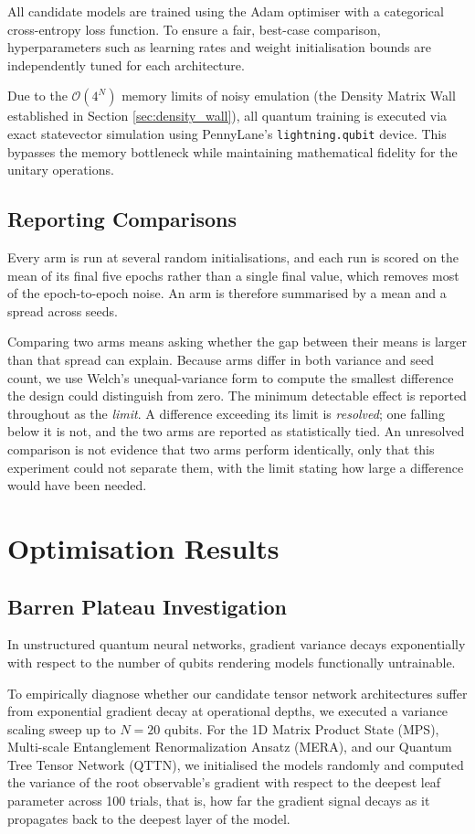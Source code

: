 \documentclass[12pt, a4paper, oneside]{report}
\begin{document}
All candidate models are trained using the Adam optimiser with a categorical cross-entropy loss function. To ensure a fair, best-case comparison, hyperparameters such as learning rates and weight initialisation bounds are independently tuned for each architecture.

Due to the $\mathcal{O}(4^N)$ memory limits of noisy emulation (the Density Matrix Wall established in Section \ref{sec:density_wall}), all quantum training is executed via exact statevector simulation using PennyLane's \texttt{lightning.qubit} device. This bypasses the memory bottleneck while maintaining mathematical fidelity for the unitary operations.

\subsection{Reporting Comparisons}
Every arm is run at several random initialisations, and each run is scored on the mean of its final five epochs rather than a single final value, which removes most of the epoch-to-epoch noise. An arm is therefore summarised by a mean and a spread across seeds.

Comparing two arms means asking whether the gap between their means is larger than that spread can explain. Because arms differ in both variance and seed count, we use Welch's unequal-variance form to compute the smallest difference the design could distinguish from zero. The minimum detectable effect is reported throughout as the \textit{limit}. A difference exceeding its limit is \textit{resolved}; one falling below it is not, and the two arms are reported as statistically tied. An unresolved comparison is not evidence that two arms perform identically, only that this experiment could not separate them, with the limit stating how large a difference would have been needed.

\section{Optimisation Results}

\subsection{Barren Plateau Investigation}
In unstructured quantum neural networks, gradient variance decays exponentially with respect to the number of qubits rendering models functionally untrainable.

To empirically diagnose whether our candidate tensor network architectures suffer from exponential gradient decay at operational depths, we executed a variance scaling sweep up to $N=20$ qubits. For the 1D Matrix Product State (MPS), Multi-scale Entanglement Renormalization Ansatz (MERA), and our Quantum Tree Tensor Network (QTTN), we initialised the models randomly and computed the variance of the root observable's gradient with respect to the deepest leaf parameter across 100 trials, that is, how far the gradient signal decays as it propagates back to the deepest layer of the model.
\end{document}
